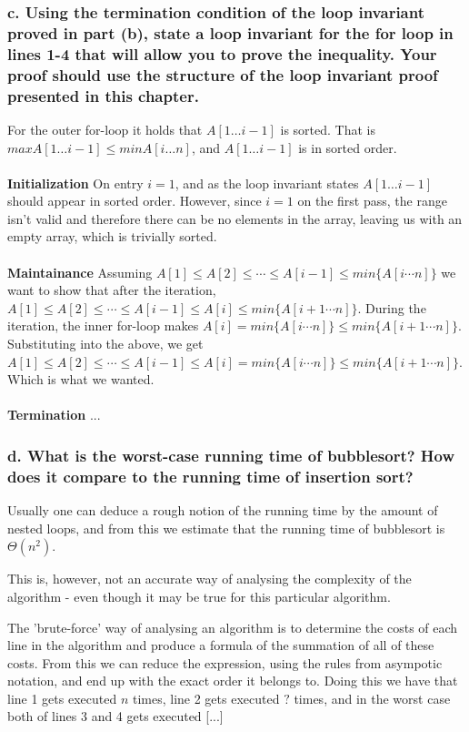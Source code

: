 \documentclass[11pt,english]{article}
\begin{document}
\subsubsection*{c. \mdseries Using the termination condition of the loop
invariant proved in part (b), state a loop invariant for the \textbf{for} loop
in lines 1-4 that will allow you to prove the inequality. Your proof should
use the structure of the loop invariant proof presented in this chapter.}
For the outer for-loop it holds that $A[1 \dots i-1]$ is sorted. That is
$max{A[1 \dots i - 1]} \leq min{A[i \dots n]}$, and $A[1 \dots i-1]$ is
in sorted order.
\\\\
\textbf{Initialization} \mdseries On entry $i = 1$, and as the loop invariant
states $A[1 \dots i - 1]$ should appear in sorted order. However, since
$i = 1$ on the first pass, the range isn't valid and therefore there can be
no elements in the array, leaving us with an empty array, which is trivially
sorted.
\\\\
\textbf{Maintainance} \mdseries Assuming $ A[1] \leq A[2] \leq \cdots \leq 
A[i-1] \leq min\{ A[i \cdots n] \}$ we want to show that after the iteration,
$ A[1] \leq A[2] \leq \cdots \leq A[i-1] \leq A[i] \leq min\{ A[i+1 \cdots n]
\}$. During the iteration, the inner for-loop makes $A[i] = min\{ A[i \cdots 
n] \} \leq min\{ A[i+1 \cdots n] \}$. Substituting into the above, we get $ 
A[1] \leq A[2] \leq \cdots \leq A[i-1] \leq A[i] = min\{ A[i \cdots n] \} 
\leq min\{ A[i+1 \cdots n] \}$. Which is what we wanted.
\\\\
\textbf{Termination} \mdseries ...

\subsubsection*{d. \mdseries What is the worst-case running time of
bubblesort? How does it compare to the running time of insertion sort?}
Usually one can deduce a rough notion of the running time by the amount of
nested loops, and from this we estimate that the running time of bubblesort
is $\Theta(n^2)$.

This is, however, not an accurate way of analysing the complexity of the
algorithm - even though it may be true for this particular algorithm.

The 'brute-force' way of analysing an algorithm is to determine the costs of
each line in the algorithm and produce a formula of the summation of all of
these costs. From this we can reduce the expression, using the rules from
asympotic notation, and end up with the exact order it belongs to. Doing this
we have that line 1 gets executed $n$ times, line 2 gets executed
$?$ times, and in the worst case both of lines 3 and 4 gets executed [...]
\end{document}
